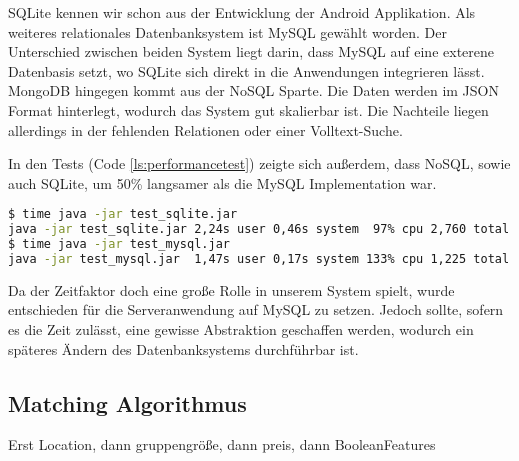 SQLite kennen wir schon aus der Entwicklung der Android Applikation. Als weiteres relationales Datenbanksystem ist MySQL gewählt worden. Der Unterschied zwischen beiden System liegt darin, dass MySQL auf eine exterene Datenbasis setzt, wo SQLite sich direkt in die Anwendungen integrieren lässt. MongoDB hingegen kommt aus der NoSQL Sparte. Die Daten werden im JSON Format hinterlegt, wodurch das System gut skalierbar ist. Die Nachteile liegen allerdings in der fehlenden Relationen oder einer Volltext-Suche.

In den Tests (Code \ref{ls:performancetest}) zeigte sich außerdem, dass NoSQL, sowie auch SQLite, um 50\% langsamer als die MySQL Implementation war.

\begin{lstlisting}[label=ls:performancetest,caption=Perfomancetest zwischen MySQL und SQLite,language=bash]
$ time java -jar test_sqlite.jar
java -jar test_sqlite.jar 2,24s user 0,46s system  97% cpu 2,760 total
$ time java -jar test_mysql.jar
java -jar test_mysql.jar  1,47s user 0,17s system 133% cpu 1,225 total
\end{lstlisting}

Da der Zeitfaktor doch eine große Rolle in unserem System spielt, wurde entschieden für die Serveranwendung auf MySQL zu setzen. Jedoch sollte, sofern es die Zeit zulässt, eine gewisse Abstraktion geschaffen werden, wodurch ein späteres Ändern des Datenbanksystems durchführbar ist.

\subsection{Matching Algorithmus}

Erst Location, dann gruppengröße, dann preis, dann BooleanFeatures

